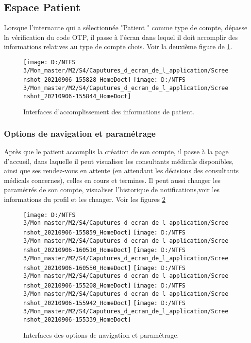 \subsection{Espace Patient}
Lorsque l'internaute qui a sélectionnée "Patient " comme type de compte, dépasse la vérification du code \gls{OTP}, il passe à l'écran dans lequel il doit accomplir des informations relatives au type de compte chois. Voir la deuxième figure de \ref{Figure 5.3}.
\begin{figure}[h]
	\texttt{[image: D:/NTFS 3/Mon\_master/M2/S4/Caputures\_d\_ecran\_de\_l\_application/Screenshot\_20210906-155828\_HomeDoct]}
	\texttt{[image: D:/NTFS 3/Mon\_master/M2/S4/Caputures\_d\_ecran\_de\_l\_application/Screenshot\_20210906-155844\_HomeDoct]}
	\centering
	\caption{Interfaces d'accomplissement des informations de patient.}
	\label{Figure 5.3}
\end{figure}
\newline

\subsubsection{Options de navigation et paramétrage}
Après que le patient accomplis la création de son compte, il passe à la page d'accueil, dans laquelle il peut visualiser les consultants médicals disponibles, ainsi que ses rendez-vous en attente (en attendant les décisions des consultants médicals concernes), celles en cours et termines. Il peut aussi changer les paramétrés de son compte, visualiser l'historique de notifications,voir les informations du profil et les changer. Voir les figures \ref{Figure 5.4}
\begin{figure}[!h]
	\texttt{[image: D:/NTFS 3/Mon\_master/M2/S4/Caputures\_d\_ecran\_de\_l\_application/Screenshot\_20210906-155859\_HomeDoct]}
	\texttt{[image: D:/NTFS 3/Mon\_master/M2/S4/Caputures\_d\_ecran\_de\_l\_application/Screenshot\_20210906-160510\_HomeDoct]}
	\texttt{[image: D:/NTFS 3/Mon\_master/M2/S4/Caputures\_d\_ecran\_de\_l\_application/Screenshot\_20210906-160550\_HomeDoct]}
	\texttt{[image: D:/NTFS 3/Mon\_master/M2/S4/Caputures\_d\_ecran\_de\_l\_application/Screenshot\_20210906-155208\_HomeDoct]}
	\texttt{[image: D:/NTFS 3/Mon\_master/M2/S4/Caputures\_d\_ecran\_de\_l\_application/Screenshot\_20210906-155942\_HomeDoct]}
	\texttt{[image: D:/NTFS 3/Mon\_master/M2/S4/Caputures\_d\_ecran\_de\_l\_application/Screenshot\_20210906-155339\_HomeDoct]}
	\centering
	\caption{Interfaces des options de navigation et paramétrage.}
	\label{Figure 5.4}
\end{figure}

